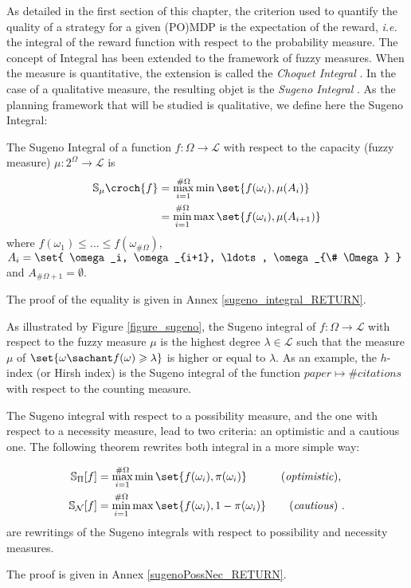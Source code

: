 As detailed in the first section of this chapter,
the criterion used to quantify the quality of a strategy
for a given (PO)MDP
is the expectation of the reward, \textit{i.e.}
the integral of the reward function 
with respect to the probability measure.
The concept of Integral has been extended to
the framework of fuzzy measures.
When the measure is quantitative, the extension is called the \textit{Choquet Integral} \cite{Choquet1954}.
In the case of a qualitative measure, the resulting objet is the \textit{Sugeno Integral} \cite{Sugeno74}.
As the planning framework that will be studied is qualitative,
we define here the Sugeno Integral:
\begin{Def}
\label{sugeno_integral}
The Sugeno Integral of a function 
$f:\Omega \rightarrow \mathcal{L}$ with respect to the capacity (fuzzy measure) $\mu:2^{\Omega} \rightarrow \mathcal{L}$ is 
\begin{align} 
\label{equation_sugeno1} \mathbb{S}_{\mu} \croch{ f } &= \max_{i=1}^{\# \Omega} \min \set{ f(\omega_i), \mu(A_i) } \\
\label{equation_sugeno2} &=  \min_{i=1}^{\# \Omega} \max \set{ f(\omega_i), \mu(A_{i+1}) }
\end{align}
where $f(\omega_1) \leqslant \ldots \leqslant f(\omega_{\# \Omega})$, 
 $A_i = \set{ \omega_i, \omega_{i+1}, \ldots, \omega_{\# \Omega} }$
and $A_{\#\Omega+1} = \emptyset$.
\end{Def}
The proof of the equality is given in Annex \ref{sugeno_integral_RETURN}.

As illustrated by Figure \ref{figure_sugeno}, the Sugeno integral of $f: \Omega \rightarrow \mathcal{L}$ with respect to the fuzzy measure $\mu$
is the highest degree $\lambda \in \mathcal{L}$ 
such that the measure $\mu$ of $\set{ \omega \sachant f(\omega) \geqslant \lambda}$ 
is higher or equal to $\lambda$. As an example, the $h$-index
(or Hirsh index) is the Sugeno integral of the function $paper \mapsto \# citations$ 
with respect to the counting measure.

The Sugeno integral with respect to a possibility measure,
and the one with respect to a necessity measure,
lead to two  criteria: an optimistic and a cautious one.
The following theorem rewrites both integral in a more simple way:
\begin{theorem}
\label{sugenoPossNec}
\begin{align}
\label{equation_sugenoposs} \mathbb{S}_{\Pi}[f] &= \max_{i=1}^{\# \Omega} \min \set{ f(\omega_i), \pi(\omega_i) }  & \mbox{ (\textit{optimistic}), }\\
\label{equation_sugenonec} \mathbb{S}_{\mathcal{N}}[f] &= \min_{i=1}^{\# \Omega} \max \set{ f(\omega_i), 1-\pi(\omega_i) }  & \mbox{ (\textit{cautious}) }.
\end{align}
are rewritings of the Sugeno integrals with respect to 
possibility and necessity measures.
\end{theorem}
The proof is given in Annex \ref{sugenoPossNec_RETURN}.

